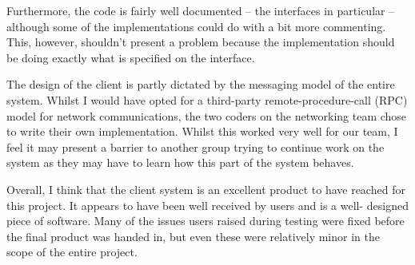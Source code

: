 Furthermore, the code is fairly well documented -- the interfaces in particular
-- although some of the implementations could do with a bit more commenting. 
This, however, shouldn't present a problem because the implementation should be
doing exactly what is specified on the interface.

The design of the client is partly dictated by the messaging model of the
entire system. Whilst I would have opted for a third-party remote-procedure-call
(RPC) model for network communications, the two coders on the networking team
chose to write their own implementation. Whilst this worked very well for our
team, I feel it may present a barrier to another group trying to continue work
on the system as they may have to learn how this part of the system behaves.

Overall, I think that the client system is an excellent product to have reached
for this project. It appears to have been well received by users and is a well-
designed piece of software. Many of the issues users raised during testing were
fixed before the final product was handed in, but even these were relatively
minor in the scope of the entire project.
